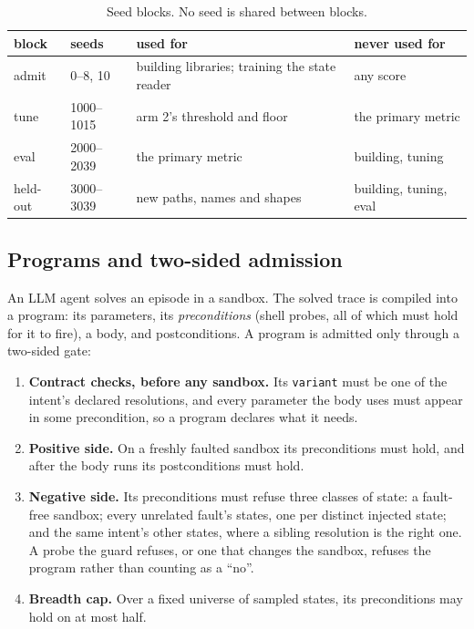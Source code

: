 \documentclass[11pt]{article}
\newcommand{\code}[1]{\texttt{#1}}
\begin{document}
\begin{table}[t]
\centering
\caption{Seed blocks. No seed is shared between blocks.}
\label{tab:seeds}
\small
\begin{tabularx}{\linewidth}{lll X}
\toprule
block & seeds & used for & never used for \\
\midrule
admit & 0--8, 10 & building libraries; training the state reader & any score \\
tune & 1000--1015 & arm 2's threshold and floor & the primary metric \\
eval & 2000--2039 & the primary metric & building, tuning \\
held-out & 3000--3039 & new paths, names and shapes & building, tuning, eval \\
\bottomrule
\end{tabularx}
\end{table}

\subsection{Programs and two-sided admission}

An LLM agent solves an episode in a sandbox. The solved trace is compiled into a program: its
parameters, its \emph{preconditions} (shell probes, all of which must hold for it to fire), a
body, and postconditions. A program is admitted only through a two-sided gate:

\begin{enumerate}
  \item \textbf{Contract checks, before any sandbox.} Its \code{variant} must be one of the
  intent's declared resolutions, and every parameter the body uses must appear in some
  precondition, so a program declares what it needs.
  \item \textbf{Positive side.} On a freshly faulted sandbox its preconditions must hold, and
  after the body runs its postconditions must hold.
  \item \textbf{Negative side.} Its preconditions must refuse three classes of state: a
  fault-free sandbox; every unrelated fault's states, one per distinct injected state; and the
  same intent's other states, where a sibling resolution is the right one. A probe the guard
  refuses, or one that changes the sandbox, refuses the program rather than counting as a
  ``no''.
  \item \textbf{Breadth cap.} Over a fixed universe of sampled states, its preconditions may
  hold on at most half.
\end{enumerate}
\end{document}
